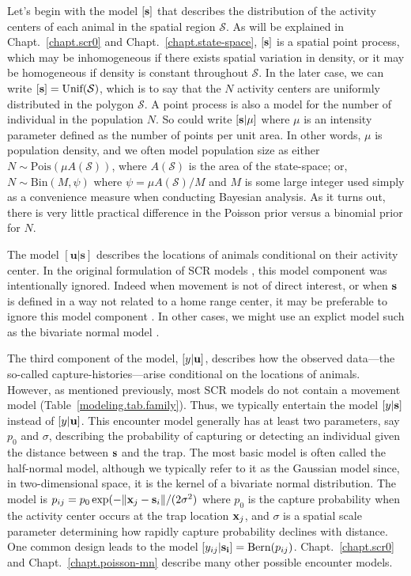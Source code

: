 Let's begin with the model $[{\bf s}]$ that describes the
distribution of the activity centers of each animal in the
spatial region $\mathcal{S}$.
As will be explained in Chapt.~\ref{chapt.scr0} and
Chapt.~\ref{chapt.state-space}, $[{\bf s}]$ is a spatial point process, which may be
inhomogeneous if there exists spatial variation in density, or it may
be homogeneous if density is constant throughout $\mathcal{S}$. In the
later case, we can write $[{\bf s}] = \text{Unif}(\mathcal{S})$, which
is to say that the $N$ activity centers are uniformly distributed in
the polygon $\mathcal{S}$. A point process is also a model for the
number of individual in the population $N$. So
could write %
$[{\bf s}|\mu]$ where $\mu$ is an intensity
parameter defined as the number of points per unit area. In other
words, $\mu$ is population density, and we often model population size
as either $N \sim \text{Pois}(\mu A(\mathcal{S}))$, where
$A(\mathcal{S})$ is the area of the state-space; or,
$N \sim \text{Bin}(M, \psi)$ where $\psi = \mu A(\mathcal{S}) / M$ and
$M$ is some large integer used simply as a convenience measure when
conducting Bayesian analysis. As it turns out, there is very little
practical difference in the Poisson prior versus a binomial prior for
$N$.

The model $[\mathbf{u}|\mathbf{s}]$ describes the locations of
animals conditional on their activity center. In the original
formulation of SCR models \citep{efford:2004}, this model component
was intentionally ignored. Indeed when movement is not of direct
interest, or when $\bf s$ is defined in a way not related to a home
range center, it may be preferable to ignore this model component
\citep{borchers:2011}. In other cases, we might use an explict model
such as the bivariate normal model \citep{royle_young:2008}.

The third component of the model, $[y|{\bf u}]$, describes how the
observed data---the so-called capture-histories---arise conditional on
the locations of animals. However, as mentioned previously, most SCR
models do not contain a movement model
(Table~\ref{modeling.tab.family}). Thus, we typically entertain
the model $[y|{\bf s}]$ instead of $[y|{\bf u}]$.
This encounter model
generally has at least two parameters, say $p_0$ and $\sigma$, describing the probability of
capturing or detecting an individual given the distance between $\bf
s$ and the trap. The most basic model is
often called the half-normal model, although we typically refer to it as the
Gaussian model since, in two-dimensional space, it is the kernel of a
bivariate normal distribution. The model is
$p_{ij} = p_0\exp(-\|{\bf x}_j - {\bf s}_i\| / (2\sigma^2)$ where
$p_0$ is the capture probability when the activity center occurs at
the trap location ${\bf x}_j$, and $\sigma$ is a spatial scale
parameter determining how rapidly capture probability declines with
distance. One common design leads to the model
$[y_{ij}|{\bf s_i}] =  \text{Bern}(p_{ij})$. Chapt.~\ref{chapt.scr0} and
Chapt.~\ref{chapt.poisson-mn} describe many other possible encounter models.

